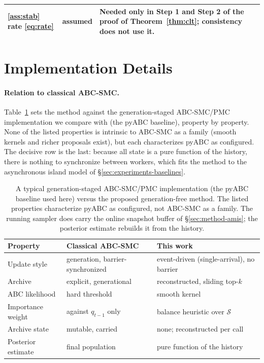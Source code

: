 \documentclass[10pt]{article}
\theoremstyle{plain}
\theoremstyle{definition}
\begin{document}
\begin{table}[h]
\begin{tabular}{@{}p{}p{}p{}@{}}
\ref{ass:stab} rate \eqref{eq:rate} & assumed & Needed only in Step 1 and Step 2 of the proof of Theorem~\ref{thm:clt}; consistency does not use it. \\
\bottomrule
\end{tabular}
\end{table}

\section{Implementation Details}\label{app:implementation}

\paragraph{Relation to classical ABC-SMC.}\label{sec:method-comparison}
Table~\ref{tab:method-comparison} sets the method against the generation-staged ABC-SMC/PMC implementation we compare with (the pyABC baseline), property by property. None of the listed properties is intrinsic to ABC-SMC as a family (smooth kernels and richer proposals exist), but each characterizes pyABC as configured. The decisive row is the last: because all state is a pure function of the history, there is nothing to synchronize between workers, which fits the method to the asynchronous island model of \S\ref{sec:experiments-baselines}.
\begin{table}[h]
\caption{A typical generation-staged ABC-SMC/PMC implementation (the pyABC baseline used here) versus the proposed generation-free method. The listed properties characterize pyABC as configured, not ABC-SMC as a family. The running sampler does carry the online snapshot buffer of \S\ref{sec:method-amis}; the posterior estimate rebuilds it from the history.}\label{tab:method-comparison}
\centering
\begin{tabular}{@{}lll@{}}
\toprule
Property & Classical ABC-SMC & This work \\
\midrule
Update style & generation, barrier-synchronized & event-driven (single-arrival), no barrier \\
Archive & explicit, generational & reconstructed, sliding top-$k$ \\
ABC likelihood & hard threshold & smooth kernel \\
Importance weight & against $q_{t-1}$ only & balance heuristic over $\mathcal{S}$ \\
Archive state & mutable, carried & none; reconstructed per call \\
Posterior estimate & final population & pure function of the history \\
\bottomrule
\end{tabular}
\end{table}
\end{document}
